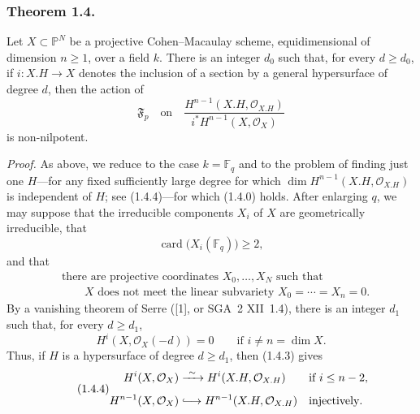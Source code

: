 \subsubsection*{Theorem 1.4.}
Let $X\subset\mathbb P^N$ be a projective Cohen--Macaulay scheme,
equidimensional of dimension $n\geq1$, over a field $k$.  There is an
integer $d_0$ such that, for every $d\geq d_0$, if
$i:X.H\longrightarrow X$ denotes the inclusion of a section by a general
hypersurface of degree $d$, then the action of
\begin{equation}\tag{1.4.0}
\mathfrak F_p\quad\text{on}\quad
\frac{H^{n-1}(X.H,\mathcal O_{X.H})}
     {i^*H^{n-1}(X,\mathcal O_X)}
\end{equation}
is non-nilpotent.

\medskip
\noindent\emph{Proof.}
As above, we reduce to the case $k=\mathbb F_q$ and to the problem of
finding just one $H$---for any fixed sufficiently large degree for which
$\dim H^{n-1}(X.H,\mathcal O_{X.H})$ is independent of $H$; see
(1.4.4)---for which (1.4.0) holds.  After enlarging $q$, we may suppose
that the irreducible components $X_i$ of $X$ are geometrically irreducible,
that
\begin{equation}\tag{1.4.1}
\operatorname{card}\bigl(X_i(\mathbb F_q)\bigr)\geq2,
\end{equation}
and that
\begin{equation}\tag{1.4.2}
\begin{aligned}
&\text{there are projective coordinates }X_0,\dots,X_N\text{ such that}\\
&\qquad X\text{ does not meet the linear subvariety }
X_0=\cdots=X_n=0.
\end{aligned}
\end{equation}
By a vanishing theorem of Serre ([1], or SGA~2 XII~1.4), there is an
integer $d_1$ such that, for every $d\geq d_1$,
\begin{equation}\tag{1.4.3}
H^i(X,\mathcal O_X(-d))=0\qquad\text{if }i\ne n=\dim X.
\end{equation}
Thus, if $H$ is a hypersurface of degree $d\geq d_1$, then (1.4.3) gives
\begin{equation}\tag{1.4.4}
\begin{aligned}
H^i(X,\mathcal O_X)&\xrightarrow{\ \sim\ }
 H^i(X.H,\mathcal O_{X.H}) &&\text{if }i\leq n-2,\\[1ex]
H^{n-1}(X,\mathcal O_X)&\lhook\joinrel\longrightarrow
 H^{n-1}(X.H,\mathcal O_{X.H}) &&\text{injectively}.
\end{aligned}
\end{equation}

